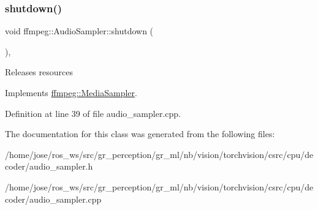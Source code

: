 \mbox{\label{classffmpeg_1_1AudioSampler_a703ec8da8cc9e6e9701bed75cbc40085}} 
\subsubsection{\texorpdfstring{shutdown()}{shutdown()}}
{\footnotesize\ttfamily void ffmpeg\+::\+Audio\+Sampler\+::shutdown (\begin{DoxyParamCaption}{ }\end{DoxyParamCaption})\hspace{0.3cm}{\ttfamily [override]}, {\ttfamily [virtual]}}

Releases resources 

Implements \hyperlink{classffmpeg_1_1MediaSampler_ac8f2fee9cdf896871776a8202d70edd7}{ffmpeg\+::\+Media\+Sampler}.



Definition at line 39 of file audio\+\_\+sampler.\+cpp.



The documentation for this class was generated from the following files\+:\begin{DoxyCompactItemize}
\item 
/home/jose/ros\+\_\+ws/src/gr\+\_\+perception/gr\+\_\+ml/nb/vision/torchvision/csrc/cpu/decoder/audio\+\_\+sampler.\+h\item 
/home/jose/ros\+\_\+ws/src/gr\+\_\+perception/gr\+\_\+ml/nb/vision/torchvision/csrc/cpu/decoder/audio\+\_\+sampler.\+cpp\end{DoxyCompactItemize}
